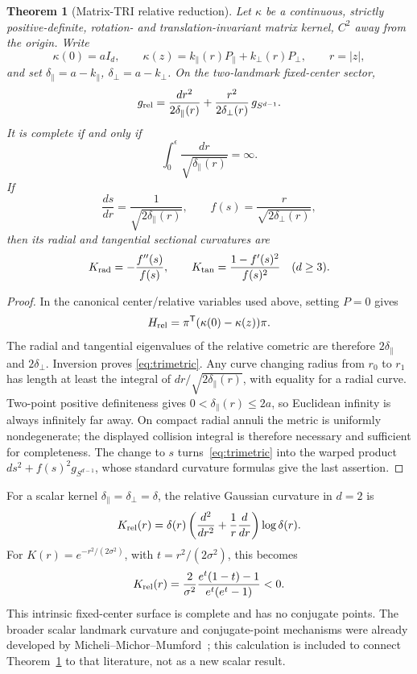 \documentclass[11pt]{article}
\newtheorem{theorem}{Theorem}
\begin{document}
\begin{theorem}[Matrix-TRI relative reduction]
\label{thm:matrixtri}
Let \(\kappa\) be a continuous, strictly positive-definite, rotation- and
translation-invariant matrix kernel, \(C^2\) away from the origin.  Write
\[
 \kappa(0)=aI_d,
 \qquad
 \kappa(z)=k_\parallel(r)P_\parallel+k_\perp(r)P_\perp,
 \qquad r=|z|,
\]
and set \(\delta_\parallel=a-k_\parallel\),
\(\delta_\perp=a-k_\perp\).  On the two-landmark fixed-center sector,
\begin{equation}
 g_{\rm rel}
 =\frac{dr^2}{2\delta_\parallel(r)}
 +\frac{r^2}{2\delta_\perp(r)}\,g_{S^{d-1}}.
 \label{eq:trimetric}
\end{equation}
It is complete if and only if
\[
 \int_0^\epsilon\frac{dr}{\sqrt{\delta_\parallel(r)}}=\infty.
\]
If
\[
 \frac{ds}{dr}=\frac1{\sqrt{2\delta_\parallel(r)}},
 \qquad
 f(s)=\frac{r}{\sqrt{2\delta_\perp(r)}},
\]
then its radial and tangential sectional curvatures are
\[
 K_{\rm rad}=-\frac{f''(s)}{f(s)},
 \qquad
 K_{\rm tan}=\frac{1-f'(s)^2}{f(s)^2}\quad(d\ge3).
\]
\end{theorem}

\begin{proof}
In the canonical center/relative variables used above, setting \(P=0\)
gives
\[
 H_{\rm rel}
 =\pi^{\mathsf T}(\kappa(0)-\kappa(z))\pi.
\]
The radial and tangential eigenvalues of the relative cometric are therefore
\(2\delta_\parallel\) and \(2\delta_\perp\).  Inversion proves
\eqref{eq:trimetric}.  Any curve changing radius from \(r_0\) to \(r_1\) has
length at least the integral of
\(dr/\sqrt{2\delta_\parallel(r)}\), with equality for a radial curve.
Two-point positive definiteness gives
\(0<\delta_\parallel(r)\le2a\), so Euclidean infinity is always infinitely
far away.  On compact radial annuli the metric is uniformly nondegenerate;
the displayed collision integral is therefore necessary and sufficient for
completeness.  The change to \(s\) turns~\eqref{eq:trimetric} into the warped
product \(ds^2+f(s)^2g_{S^{d-1}}\), whose standard curvature formulas give the
last assertion.
\end{proof}

For a scalar kernel \(\delta_\parallel=\delta_\perp=\delta\), the relative
Gaussian curvature in \(d=2\) is
\[
 K_{\rm rel}(r)
 =\delta(r)\left(\frac{d^2}{dr^2}+\frac1r\frac d{dr}\right)\log\delta(r).
\]
For \(K(r)=e^{-r^2/(2\sigma^2)}\), with
\(t=r^2/(2\sigma^2)\), this becomes
\[
 K_{\rm rel}(r)=\frac{2}{\sigma^2}
 \frac{e^t(1-t)-1}{e^t(e^t-1)}<0.
\]
This intrinsic fixed-center surface is complete and has no conjugate points.
The broader scalar landmark curvature and conjugate-point mechanisms were
already developed by Micheli--Michor--Mumford~\cite{MMM}; this calculation is
included to connect Theorem~\ref{thm:matrixtri} to that literature, not as a
new scalar result.
\end{document}
